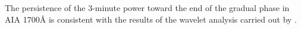 

The persistence of the 3-minute power toward the end of the gradual phase
in AIA 1700\AA{} is consistent with the results of the wavelet analysis
carried out by \cite{Milligan2017}.
